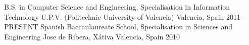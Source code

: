 \begin{cventries}
  \cventry
    {B.S. in Computer Science and Engineering, Specialisation in Information Technology}
    {U.P.V. (Politechnic University of Valencia)}
    {Valencia, Spain}
    {2011 - PRESENT}
    {}  
  \cventry
    {Spanish Baccaulaureate School, Specialisation in Sciences and Engineering}
    {Jose de Ribera, Xátiva}
    {Valencia, Spain}
    {2010}
    {}
\end{cventries}
